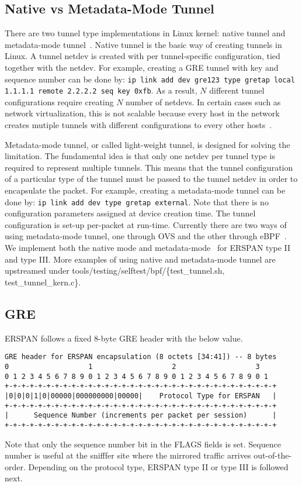 \documentclass[10pt]{sigplanconf}
\begin{document}
\subsection{Native vs Metadata-Mode Tunnel}
There are two tunnel type implementations in Linux kernel:
native tunnel and metadata-mode tunnel~\cite{lwtunnel}.
Native tunnel is the basic way of creating tunnels in Linux.
A tunnel netdev is created with per tunnel-specific configuration,
tied together with the netdev. For example, creating a GRE tunnel
with key and sequence number can be done by:
\texttt{ip link add dev gre123 type gretap local 1.1.1.1 remote 2.2.2.2 seq key 0xfb}.
As a result, $N$ different tunnel configurations require creating
$N$ number of netdevs.  In certain cases such as network virtualization,
this is not scalable because every host in the network creates
mutiple tunnels with different configurations to every other hosts~\cite{nvp}.

Metadata-mode tunnel, or called light-weight tunnel, is designed for solving
the limitation.  The fundamental idea is that only one netdev per
tunnel type is required to represent multiple tunnels.
This means that the tunnel configuration of a particular type
of the tunnel must be passed to the tunnel netdev in order
to encapsulate the packet.  For example, creating a metadata-mode
tunnel can be done by:
\texttt{ip link add dev type gretap external}.
Note that there is no configuration parameters assigned at device creation
time. The tunnel configuration is set-up per-packet at run-time.
Currently there are two ways of using metadata-mode tunnel, one through
OVS and the other through eBPF~\cite{daniel2}.
We implement both the native mode and metadata-mode~\cite{erspanmd}
for ERSPAN type II and type III.
More examples of using native and metadata-mode tunnel are upstreamed
under tools/testing/selftest/bpf/\{test\_tunnel.sh, test\_tunnel\_kern.c\}.

\subsection{GRE}
ERSPAN follows a fixed 8-byte GRE header with the below value.
{\scriptsize
\begin{verbatim}
GRE header for ERSPAN encapsulation (8 octets [34:41]) -- 8 bytes
0                   1                   2                   3
0 1 2 3 4 5 6 7 8 9 0 1 2 3 4 5 6 7 8 9 0 1 2 3 4 5 6 7 8 9 0 1
+-+-+-+-+-+-+-+-+-+-+-+-+-+-+-+-+-+-+-+-+-+-+-+-+-+-+-+-+-+-+-+-+
|0|0|0|1|0|00000|000000000|00000|    Protocol Type for ERSPAN   |
+-+-+-+-+-+-+-+-+-+-+-+-+-+-+-+-+-+-+-+-+-+-+-+-+-+-+-+-+-+-+-+-+
|      Sequence Number (increments per packet per session)      |
+-+-+-+-+-+-+-+-+-+-+-+-+-+-+-+-+-+-+-+-+-+-+-+-+-+-+-+-+-+-+-+-+
\end{verbatim}
}
Note that only the sequence number bit in the FLAGS fields is set.
Sequence number is useful at the snifffer site where the mirrored
traffic arrives out-of-the-order.  Depending on the protocol type,
ERSPAN type II or type III is followed next.
\end{document}
